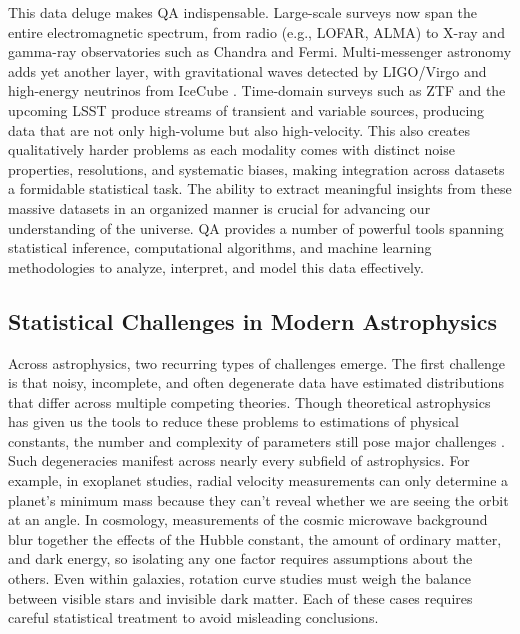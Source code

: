\documentclass[preprint,longauthor]{aastex631}
\numberwithin{equation}{section}
\begin{document}
This data deluge makes QA indispensable. Large-scale surveys now span the entire electromagnetic spectrum, from radio (e.g., LOFAR, ALMA) to X-ray and gamma-ray observatories such as Chandra and Fermi. Multi-messenger astronomy adds yet another layer, with gravitational waves detected by LIGO/Virgo and high-energy neutrinos from IceCube \citep{abbasiSearchIceCubeSubTeV2023}. Time-domain surveys such as ZTF and the upcoming LSST produce streams of transient and variable sources, producing data that are not only high-volume but also high-velocity. This also creates qualitatively harder problems as each modality comes with distinct noise properties, resolutions, and systematic biases, making integration across datasets a formidable statistical task. The ability to extract meaningful insights from these massive datasets in an organized manner is crucial for advancing our understanding of the universe. QA provides a number of powerful tools spanning statistical inference, computational algorithms, and machine learning methodologies to analyze, interpret, and model this data effectively.

\subsection{Statistical Challenges in Modern Astrophysics}

Across astrophysics, two recurring types of challenges emerge. The first challenge is that noisy, incomplete, and often degenerate data have estimated distributions that differ across multiple competing theories. Though theoretical astrophysics has given us the tools to reduce these problems to estimations of physical constants, the number and complexity of parameters still pose major challenges \citep{schaferFrameworkStatisticalInference2015}. Such degeneracies manifest across nearly every subfield of astrophysics. For example, in exoplanet studies, radial velocity measurements can only determine a planet’s minimum mass because they can’t reveal whether we are seeing the orbit at an angle. In cosmology, measurements of the cosmic microwave background blur together the effects of the Hubble constant, the amount of ordinary matter, and dark energy, so isolating any one factor requires assumptions about the others. Even within galaxies, rotation curve studies must weigh the balance between visible stars and invisible dark matter. Each of these cases requires careful statistical treatment to avoid misleading conclusions.
\end{document}
